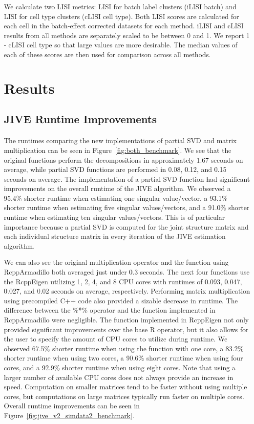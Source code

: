\documentclass[unnumsec,webpdf,contemporary,large]{oup-authoring-template}%
\theoremstyle{thmstyleone}%
\theoremstyle{thmstyletwo}%
\theoremstyle{thmstylethree}%
\begin{document}
We calculate two LISI metrics: LISI for batch label clusters (iLISI batch) and LISI for cell type clusters (cLISI cell type). Both LISI scores are calculated for each cell in the batch-effect corrected datasets for each method. iLISI and cLISI results from all methods are separately scaled to be between 0 and 1. We report 1 - cLISI cell type so that large values are more desirable. The median values of each of these scores are then used for comparison across all methods.

\section{Results}

\subsection{JIVE Runtime Improvements}

\paragraph*{}
The runtimes comparing the new implementations of partial SVD and matrix multiplication can be seen in Figure~\ref{fig:both_benchmark}. We see that the original functions perform the decompositions in approximately 1.67 seconds on average, while partial SVD functions are performed in 0.08, 0.12, and 0.15 seconds on average. The implementation of a partial SVD function had significant improvements on the overall runtime of the JIVE algorithm. We observed a 95.4\% shorter runtime when estimating one singular value/vector, a 93.1\% shorter runtime when estimating five singular values/vectors, and a 91.0\% shorter runtime when estimating ten singular values/vectors. This is of particular importance because a partial SVD is computed for the joint structure matrix and each individual structure matrix in every iteration of the JIVE estimation algorithm.

We can also see the original multiplication operator and the function using RcppArmadillo both averaged just under 0.3 seconds. The next four functions use the RcppEigen utilizing 1, 2, 4, and 8 CPU cores with runtimes of 0.093, 0.047, 0.027, and 0.02 seconds on average, respectively. Performing matrix multiplication using precompiled C++ code also provided a sizable decrease in runtime. The difference between the \%*\% operator and the function implemented in RcppArmadillo were negligible. The function implemented in RcppEigen not only provided significant improvements over the base R operator, but it also allows for the user to specify the amount of CPU cores to utilize during runtime. We observed 67.5\% shorter runtime when using the function with one core, a 83.2\% shorter runtime when using two cores, a 90.6\% shorter runtime when using four cores, and a 92.9\% shorter runtime when using eight cores. Note that using a larger number of available CPU cores does not always provide an increase in speed. Computation on smaller matrices tend to be faster without using multiple cores, but computations on large matrices typically run faster on multiple cores. Overall runtime improvements can be seen in Figure~\ref{fig:jive_v2_simdata2_benchmark}.
\end{document}
